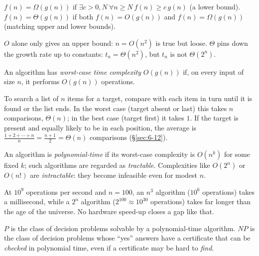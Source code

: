 \bigskip
\begin{definition}
$f(n)=\Omega(g(n))$ if $\exists c>0,N\ \forall n\ge N\ f(n)\ge c\,g(n)$ (a lower bound). $f(n)=\Theta(g(n))$ if both $f(n)=O(g(n))$ and $f(n)=\Omega(g(n))$ (matching upper and lower bounds).
\end{definition}

\begin{note}
$O$ alone only gives an upper bound: $n=O(n^2)$ is true but loose. $\Theta$ pins down the growth rate up to constants: $t_n=\Theta(n^2)$, but $t_n$ is not $\Theta(2^n)$.
\end{note}

\bigskip
\begin{definition}
An algorithm has \emph{worst-case time complexity} $O(g(n))$ if, on every input of size $n$, it performs $O(g(n))$ operations.
\end{definition}

\begin{example}
To search a list of $n$ items for a target, compare with each item in turn until it is found or the list ends. In the worst case (target absent or last) this takes $n$ comparisons, $\Theta(n)$; in the best case (target first) it takes $1$. If the target is present and equally likely to be in each position, the average is $\frac{1+2+\cdots+n}{n}=\frac{n+1}{2}=\Theta(n)$ comparisons (\S\ref{sec:6-12}).
\end{example}

\bigskip
\begin{definition}
An algorithm is \emph{polynomial-time} if its worst-case complexity is $O(n^k)$ for some fixed $k$; such algorithms are regarded as \emph{tractable}. Complexities like $O(2^n)$ or $O(n!)$ are \emph{intractable}: they become infeasible even for modest $n$.
\end{definition}

\begin{example}
At $10^9$ operations per second and $n=100$, an $n^3$ algorithm ($10^6$ operations) takes a millisecond, while a $2^n$ algorithm ($2^{100}\approx10^{30}$ operations) takes far longer than the age of the universe. No hardware speed-up closes a gap like that.
\end{example}

\bigskip
\begin{definition}
$P$ is the class of decision problems solvable by a polynomial-time algorithm. $NP$ is the class of decision problems whose ``yes'' answers have a certificate that can be \emph{checked} in polynomial time, even if a certificate may be hard to \emph{find}.
\end{definition}

